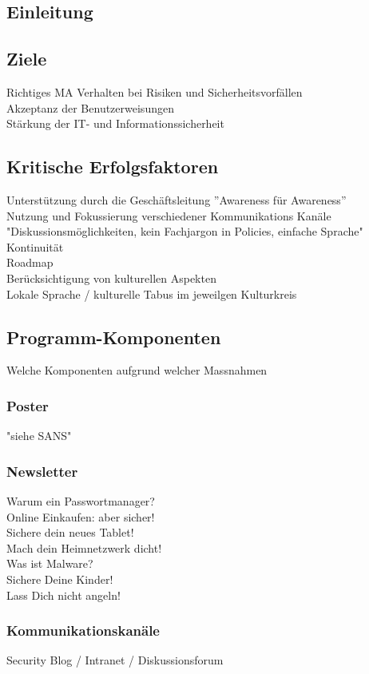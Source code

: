 \documentclass[../../main.tex]{subfiles}
\begin{document}
\subsection{Einleitung}
\subsection{Ziele}
  Richtiges MA Verhalten bei Risiken und Sicherheitsvorfällen\\
  Akzeptanz der Benutzerweisungen\\
  Stärkung der IT- und Informationssicherheit
\subsection{Kritische Erfolgsfaktoren}
  Unterstützung durch die Geschäftsleitung ''Awareness für Awareness''\\
  Nutzung und Fokussierung verschiedener Kommunikations Kanäle\\
    "Diskussionsmöglichkeiten, kein Fachjargon in Policies, einfache Sprache"\\
  Kontinuität\\
  Roadmap\\
  Berücksichtigung von kulturellen Aspekten\\
  Lokale Sprache / kulturelle Tabus im jeweilgen Kulturkreis
\subsection{Programm-Komponenten}
  Welche Komponenten aufgrund welcher Massnahmen
\subsubsection{Poster}
    "siehe SANS"
\subsubsection{Newsletter}
    Warum ein Passwortmanager?\\
    Online Einkaufen: aber sicher!\\
    Sichere dein neues Tablet!\\
    Mach dein Heimnetzwerk dicht!\\
    Was ist Malware?\\
    Sichere Deine Kinder!\\
    Lass Dich nicht angeln!
\subsubsection{Kommunikationskanäle}
    Security Blog / Intranet / Diskussionsforum
\end{document}
